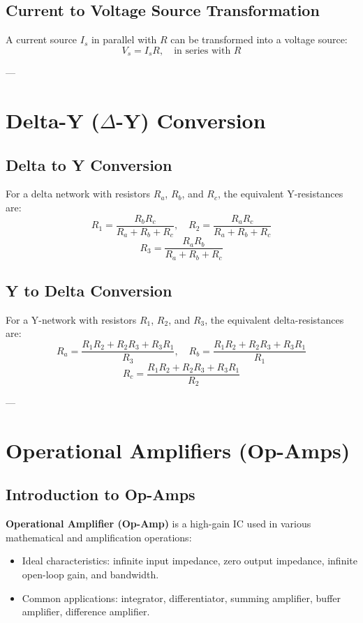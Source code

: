 \documentclass[9pt]{article}
\begin{document}
\begin{multicols*}{2}
\subsection{Current to Voltage Source Transformation}
A current source \( I_s \) in parallel with \( R \) can be transformed into a voltage source:
\[ V_s = I_s R, \quad \text{in series with } R \]

--- 

\section{Delta-Y ($\Delta$-Y) Conversion}

\subsection{Delta to Y Conversion}
For a delta network with resistors \(R_a\), \(R_b\), and \(R_c\), the equivalent Y-resistances are:
\[ R_1 = \frac{R_b R_c}{R_a + R_b + R_c}, \quad R_2 = \frac{R_a R_c}{R_a + R_b + R_c} \]
\[ R_3 = \frac{R_a R_b}{R_a + R_b + R_c} \]

\subsection{Y to Delta Conversion}
For a Y-network with resistors \(R_1\), \(R_2\), and \(R_3\), the equivalent delta-resistances are:
\[ R_a = \frac{R_1 R_2 + R_2 R_3 + R_3 R_1}{R_3}, \quad R_b = \frac{R_1 R_2 + R_2 R_3 + R_3 R_1}{R_1} \]
\[ R_c = \frac{R_1 R_2 + R_2 R_3 + R_3 R_1}{R_2} \]

--- 

\section{Operational Amplifiers (Op-Amps)}

\subsection{Introduction to Op-Amps}
\textbf{Operational Amplifier (Op-Amp)} is a high-gain IC used in various mathematical and amplification operations:
\begin{itemize}\itemsep0pt
    \item Ideal characteristics: infinite input impedance, zero output impedance, infinite open-loop gain, and bandwidth.
    \item Common applications: integrator, differentiator, summing amplifier, buffer amplifier, difference amplifier.
\end{itemize}


\end{multicols*}
\end{document}
